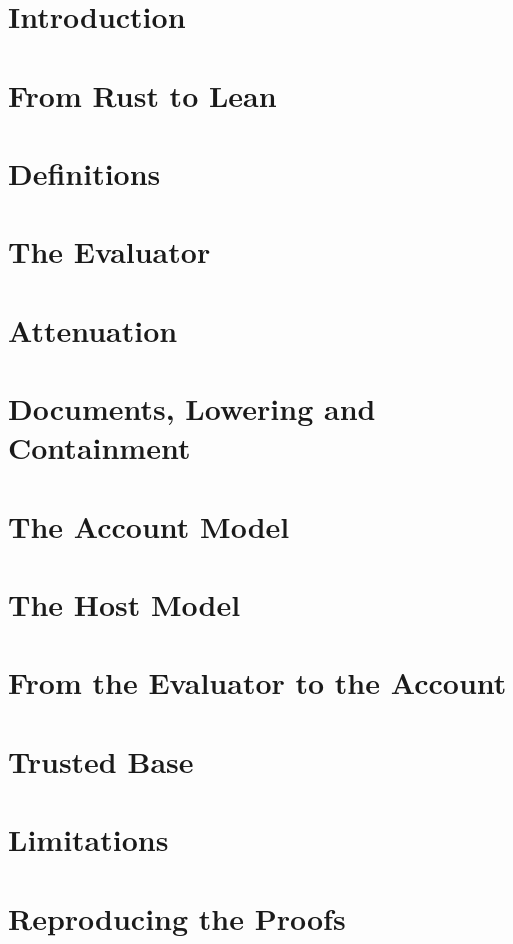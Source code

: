 \section{Introduction}\label{sec:objects}

\section{From Rust to Lean}\label{sec:pipeline}

\section{Definitions}\label{sec:definitions}

\section{The Evaluator}\label{sec:evaluator}

\section{Attenuation}\label{sec:attenuation}

\section{Documents, Lowering and Containment}\label{sec:documents}

\section{The Account Model}\label{sec:account}

\section{The Host Model}\label{sec:host}

\section{From the Evaluator to the Account}\label{sec:obligations}

\section{Trusted Base}\label{sec:trust}

\section{Limitations}\label{sec:unproved}

\appendix
\section{Reproducing the Proofs}\label{sec:reproduce}

